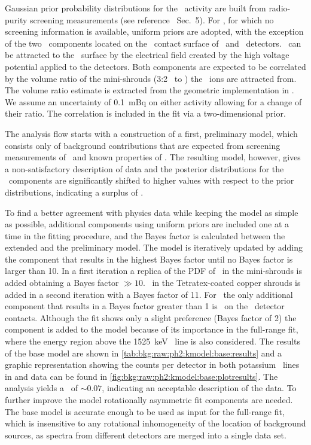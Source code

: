 Gaussian prior probability distributions for the \kvn\ activity are built from
radio-purity screening measurements (see reference~\cite{Agostini2018a} Sec.~5). For \kvz,
for which no screening information is available, uniform priors are adopted, with the
exception of the two \kvz\ components located on the \nplus\ contact surface of \bege\ and
\scoax\ detectors. \kvz\ can be attracted to the \nplus\ surface by the electrical field
created by the high voltage potential applied to the detectors. Both components are
expected to be correlated by the volume ratio of the mini-shrouds (3:2 \bege\ to \scoax)
the \kvz\ ions are attracted from. The volume ratio estimate is extracted from the
geometric implementation in \mage.  We assume an uncertainty of 0.1~mBq on either activity
allowing for a change of their ratio. The correlation is included in the fit via a
two-dimensional prior.

The analysis flow starts with a construction of a first, preliminary model, which consists
only of background contributions that are expected from screening measurements of \kvn\
and known properties of \kvz.  The resulting model, however, gives a non-satisfactory
description of data and the posterior distributions for the \kvn\ components are
significantly shifted to higher values with respect to the prior distributions, indicating
a surplus of \kvn.

To find a better agreement with physics data while keeping the model as simple as
possible, additional components using uniform priors are included one at a time in the
fitting procedure, and the Bayes factor is calculated between the extended and the
preliminary model. The model is iteratively updated by adding the component that results
in the highest Bayes factor until no Bayes factor is larger than 10.
\newpar
In a first iteration a replica of the PDF of \kvn\ in the mini-shrouds is added obtaining
a Bayes factor $\gg10$. \kvn\ in the Tetratex\reg-coated copper shrouds is added in a second
iteration with a Bayes factor of 11.  For \kvz\ the only additional component that results
in a Bayes factor greater than 1 is \kvz\ on the \nplus\ detector contacts. Although the
fit shows only a slight preference (Bayes factor of 2) the component is added to the model
because of its importance in the full-range fit, where the energy region above the
1525~keV \g\ line is also considered.
\newpar
The results of the base model are shown in \cref{tab:bkg:raw:ph2:kmodel:base:results} and
a graphic representation showing the counts per detector in both potassium \g\ lines in
\m{M1-} and \m{M2-}data can be found in \cref{fig:bkg:raw:ph2:kmodel:base:plotresults}.
The analysis yields a \pvalue\ of $\sim0.07$, indicating an acceptable description of the
data. To further improve the model rotationally asymmetric fit components are needed. The
base model is accurate enough to be used as input for the full-range fit, which is
insensitive to any rotational inhomogeneity of the location of background sources, as
spectra from different detectors are merged into a single data set.

